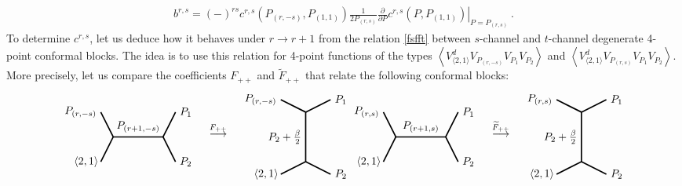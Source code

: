 \documentclass[12pt, a4paper]{article}
\begin{document}
\begin{align}
 b^{r,s} = (-)^{rs} c^{r,s}\left(P_{(r,-s)},P_{(1,1)}\right)  \frac{1}{2P_{(r,s)}}\left.\frac{\partial}{\partial P} c^{r,s}\left(P,P_{(1,1)}\right)\right|_{P=P_{(r,s)}}\ . 
 \label{bcdc}
\end{align}
To determine $c^{r,s}$, let us deduce how it behaves under $r\to r+1$ from the relation \eqref{fsfft} between $s$-channel and $t$-channel degenerate 4-point conformal blocks. The idea is to use this relation for 4-point functions of the types $\left<V^d_{\langle 2,1\rangle}V_{P_{(r,-s)}}V_{P_1}V_{P_2}\right>$ and $\left<V^d_{\langle 2,1\rangle}V_{P_{(r,s)}}V_{P_1}V_{P_2}\right>$. More precisely, let us compare the coefficients $F_{++}$ and $\widetilde{F}_{++}$ that relate the following conformal blocks:
\begin{subequations}
\begin{align}
  \begin{tikzpicture}[baseline=(current  bounding  box.center), very thick, scale = .4]
\draw (-1,2) node [left] {$P_{(r,-s)}$} -- (0,0) -- node [above] {$P_{(r+1,-s)}$} (4,0) -- (5,2) node [right] {$P_1$};
\draw (-1,-2) node [left] {$\langle 2,1\rangle\!$} -- (0,0);
\draw (4,0) -- (5,-2) node [right] {$P_2$};
\end{tikzpicture}
\quad \overset{F_{++}}{\longrightarrow} \quad 
\begin{tikzpicture}[baseline=(current  bounding  box.center), very thick, scale = .4]
 \draw (-2,3) node [left] {$P_{(r,-s)}$} -- (0,2) -- node [left] {$P_2+\frac{\beta}{2}$} (0,-2) -- (-2, -3) node [left] {$\langle 2,1\rangle\!$};
\draw (0,2) -- (2,3) node [right] {$P_1$};
\draw (0,-2) -- (2, -3) node [right] {$P_2$};
\end{tikzpicture}
\end{align}
\begin{align}
\begin{tikzpicture}[baseline=(current  bounding  box.center), very thick, scale = .4]
\draw (-1,2) node [left] {$P_{(r,s)}$} -- (0,0) -- node [above] {$P_{(r+1,s)}$} (4,0) -- (5,2) node [right] {$P_1$};
\draw (-1,-2) node [left] {$\langle 2,1\rangle\!$} -- (0,0);
\draw (4,0) -- (5,-2) node [right] {$P_2$};
\end{tikzpicture}
\quad \overset{\widetilde{F}_{++}}{\longrightarrow} \quad 
\begin{tikzpicture}[baseline=(current  bounding  box.center), very thick, scale = .4]
 \draw (-2,3) node [left] {$P_{(r,s)}$} -- (0,2) -- node [left] {$P_2+\frac{\beta}{2}$} (0,-2) -- (-2, -3) node [left] {$\langle 2,1\rangle\!$};
\draw (0,2) -- (2,3) node [right] {$P_1$};
\draw (0,-2) -- (2, -3) node [right] {$P_2$};
\end{tikzpicture}
\end{align}
\end{subequations}
\end{document}
